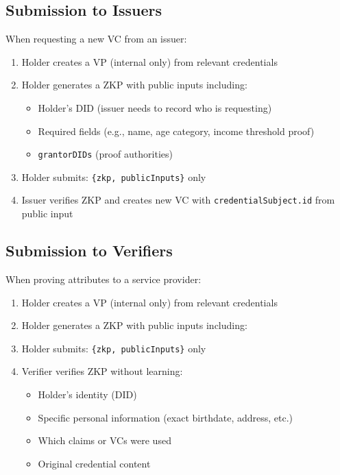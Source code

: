 \subsection{Submission to Issuers}

When requesting a new VC from an issuer:

\begin{enumerate}
  \item Holder creates a VP (internal only) from relevant credentials
  \item Holder generates a ZKP with public inputs including:
    \begin{itemize}
      \item Holder's DID (issuer needs to record who is requesting)
      \item Required fields (e.g., name, age category, income threshold proof)
      \item \texttt{grantorDIDs} (proof authorities)
    \end{itemize}
  \item Holder submits: \texttt{\{zkp, publicInputs\}} only
  \item Issuer verifies ZKP and creates new VC with \texttt{credentialSubject.id} from public input
\end{enumerate}

\subsection{Submission to Verifiers}

When proving attributes to a service provider:

\begin{enumerate}
  \item Holder creates a VP (internal only) from relevant credentials
  \item Holder generates a ZKP with public inputs including:
  \item Holder submits: \texttt{\{zkp, publicInputs\}} only
  \item Verifier verifies ZKP without learning:
    \begin{itemize}
      \item Holder's identity (DID)
      \item Specific personal information (exact birthdate, address, etc.)
      \item Which claims or VCs were used
      \item Original credential content
    \end{itemize}
\end{enumerate}

